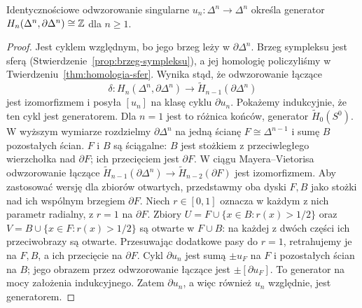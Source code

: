 \begin{lemat}
\label{lem:orientacja-simpleksu}
Identycznościowe odwzorowanie singularne
$u_n:\Delta^n\to\Delta^n$ określa
generator
$H_n(\Delta^n,\partial\Delta^n)\cong\mathbb{Z}$
dla $n\geq1$.
\end{lemat}
\begin{proof}
Jest cyklem względnym, bo jego
brzeg leży w $\partial\Delta^n$.
Brzeg sympleksu jest sferą
(Stwierdzenie~\ref{prop:brzeg-sympleksu}),
a jej homologię policzyliśmy
w Twierdzeniu~\ref{thm:homologia-sfer}.
Wynika stąd, że odwzorowanie łączące
\[
 \delta:H_n(\Delta^n,\partial\Delta^n)
 \longrightarrow
 \widetilde H_{n-1}(\partial\Delta^n)
 \]
jest izomorfizmem i posyła
$[u_n]$ na klasę cyklu
$\partial u_n$.
Pokażemy indukcyjnie, że ten
cykl jest generatorem.
Dla $n=1$ jest to różnica
końców, generator
$\widetilde H_0(S^0)$.
W wyższym wymiarze rozdzielmy
$\partial\Delta^n$ na jedną
ścianę $F\cong\Delta^{n-1}$
i sumę $B$ pozostałych ścian.
$F$ i $B$ są ściągalne:
$B$ jest stożkiem z przeciwległego
wierzchołka nad $\partial F$;
ich przecięciem jest $\partial F$.
W ciągu Mayera--Vietorisa
odwzorowanie łączące
$\widetilde H_{n-1}(\partial\Delta^n)
\to\widetilde H_{n-2}(\partial F)$
jest izomorfizmem. Aby zastosować wersję dla zbiorów otwartych, przedstawmy
oba dyski $F,B$ jako stożki nad ich wspólnym brzegiem $\partial F$.
Niech $r\in[0,1]$ oznacza w każdym z nich parametr radialny,
z $r=1$ na $\partial F$. Zbiory
$U=F\cup\{x\in B:r(x)>1/2\}$ oraz
$V=B\cup\{x\in F:r(x)>1/2\}$ są otwarte w $F\cup B$:
na każdej z dwóch części ich przeciwobrazy są otwarte.
Przesuwając dodatkowe pasy do $r=1$, retrahujemy je na $F,B$,
a ich przecięcie na $\partial F$.
Cykl $\partial u_n$ jest sumą
$\pm u_F$ na $F$ i pozostałych
ścian na $B$; jego obrazem przez
odwzorowanie łączące jest
$\pm[\partial u_F]$.
To generator na mocy
założenia indukcyjnego.
Zatem $\partial u_n$, a więc
również $u_n$ względnie,
jest generatorem.
\end{proof}

